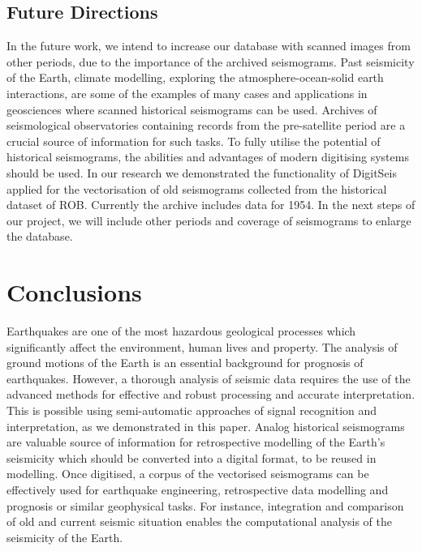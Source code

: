 \documentclass[sensors,article,accept,moreauthors,pdftex]{Definitions/mdpi}
\begin{document}
\subsection{Future Directions}
{In the future work, we intend }to {increase our database with} scanned images{ from other periods, due to the importance of the archived seismograms. Past }seismicity of the Earth, climate modelling, exploring the atmosphere-ocean-solid earth interactions, {are some of the examples of} many {cases and applications in geosciences where scanned historical seismograms can be used. }Archives of {seismological observatories containing records from }the pre-satellite period {are }a crucial source of information for such tasks. To fully utilise the potential of historical seismograms, the abilities and advantages of modern digitising systems should be used. In our research we demonstrated the functionality of DigitSeis {applied }for {the vectorisation of }old seismograms {collected }from the historical dataset of  {ROB}. Currently the {archive }includes data for 1954{. In the next steps of our project, we will include other periods and coverage of seismograms to enlarge the database.} 

\section{Conclusions}

Earthquakes are {one of }the most {hazardous geological processes which }significantly affect{ the }environment, human{ }lives and property. The analysis of ground motions of the Earth is {an essential }background for prognosis of earthquakes{. However, a thorough analysis of seismic data }requires the use of the advanced {methods }for effective {and robust }processing{ and accurate interpretation. This is possible using semi-automatic }approaches of signal recognition and interpretation{, as we demonstrated in this paper}. Analog historical seismograms are valuable source of information for retrospective modelling of the Earth's seismicity{ which should be converted into a digital format, to be reused in modelling. Once digitised, a} corpus of {the vectorised }seismograms can be effectively used{ }for earthquake {engineering, retrospective data }modelling {and prognosis or similar geophysical tasks}. {For instance, }integration and comparison of old and current seismic situation{ enables the computational }analysis of the seismicity of the Earth.  
\end{document}

